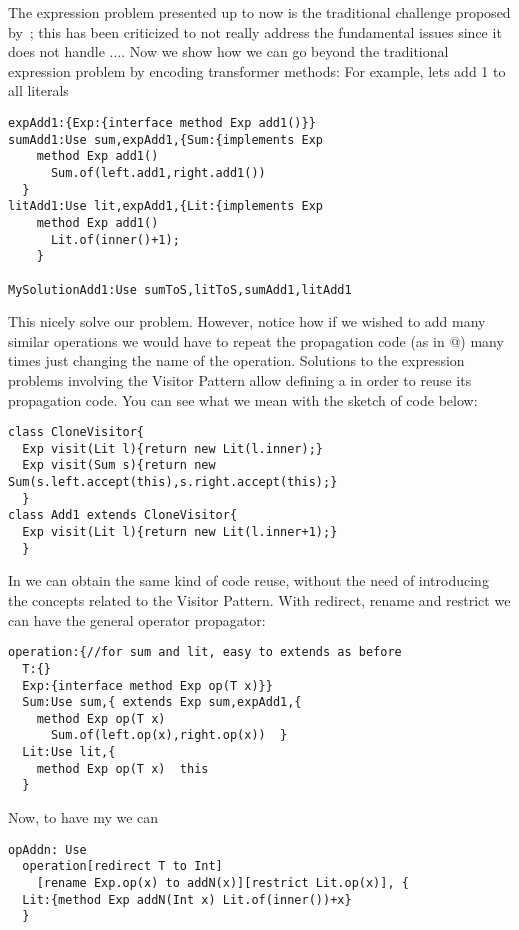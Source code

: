 The expression problem presented up to now is the traditional challenge proposed by~\cite{wadler1998expression};
this has been criticized to not really address the fundamental issues since it does not handle ....
Now we show how we can go beyond the traditional expression problem by encoding transformer methods:
For example, lets add 1 to all literals
\begin{lstlisting}
expAdd1:{Exp:{interface method Exp add1()}}
sumAdd1:Use sum,expAdd1,{Sum:{implements Exp
    method Exp add1()
      Sum.of(left.add1,right.add1())
  }
litAdd1:Use lit,expAdd1,{Lit:{implements Exp
    method Exp add1()
      Lit.of(inner()+1);
    }

MySolutionAdd1:Use sumToS,litToS,sumAdd1,litAdd1
\end{lstlisting}

This nicely solve our problem. 
However, notice how if we wished to add many similar operations we would 
have to repeat the propagation code (as in @) many times
just changing the name of the operation.
Solutions to the expression problems involving the  Visitor Pattern 
allow defining a \Q@CloneVisitor@ in order
to reuse its propagation code.
You can see what we mean with the sketch of code below:
\begin{lstlisting}
class CloneVisitor{
  Exp visit(Lit l){return new Lit(l.inner);}
  Exp visit(Sum s){return new Sum(s.left.accept(this),s.right.accept(this);}
  }
class Add1 extends CloneVisitor{
  Exp visit(Lit l){return new Lit(l.inner+1);}
  }
\end{lstlisting}
In \name we can obtain the same kind of code reuse, without the need of introducing 
the concepts related to the Visitor Pattern.
With redirect, rename and restrict we can have the general operator propagator:
\begin{lstlisting}
operation:{//for sum and lit, easy to extends as before
  T:{}
  Exp:{interface method Exp op(T x)}}
  Sum:Use sum,{ extends Exp sum,expAdd1,{
    method Exp op(T x)
      Sum.of(left.op(x),right.op(x))  }
  Lit:Use lit,{
    method Exp op(T x)  this
  }
\end{lstlisting}

Now, to have my \Q@addN@ we can

\begin{lstlisting}
opAddn: Use
  operation[redirect T to Int]
    [rename Exp.op(x) to addN(x)][restrict Lit.op(x)], {
  Lit:{method Exp addN(Int x) Lit.of(inner())+x}
  }
\end{lstlisting}  




